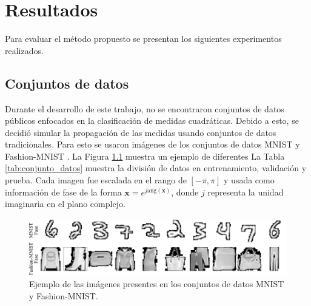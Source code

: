 
\chapter{Resultados}

Para evaluar el método propuesto se presentan los siguientes experimentos realizados. 

\section{Conjuntos de datos}

Durante el desarrollo de este trabajo, no se encontraron conjuntos de datos públicos enfocados en la clasificación de medidas cuadráticas. Debido a esto, se decidió simular la propagación de las medidas usando conjuntos de datos tradicionales. Para esto se usaron imágenes de los conjuntos de datos MNIST  y Fashion-MNIST . La Figura \ref{fig:conjunto_datos} muestra un ejemplo de diferentes La Tabla \ref{tab:conjunto_datos} muestra la división de datos en entrenamiento, validación y prueba. Cada imagen fue escalada en el rango de $[-\pi, \pi]$ y usada como información de fase de la forma $\mathbf{x}=e^{j\mathrm{ang}(\mathbf{x})}$, donde $j$ representa la unidad imaginaria en el plano complejo.

\begin{figure}[!h]
    \centering
    \includegraphics[width=\linewidth]{images/datasets.pdf}
    \caption{Ejemplo de las imágenes presentes en los conjuntos de datos MNIST y Fashion-MNIST.}
    \label{fig:conjunto_datos}
\end{figure}


